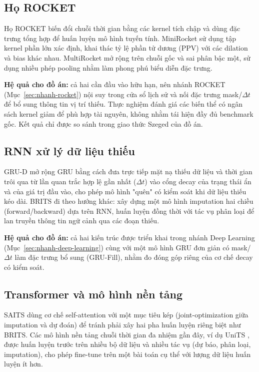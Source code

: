 \subsection{Họ ROCKET}
\label{sec:lit-rocket}

Họ ROCKET biến đổi chuỗi thời gian bằng các kernel tích chập và dùng đặc trưng tổng hợp để huấn luyện mô hình tuyến tính. MiniRocket \cite{dempster2021minirocket} sử dụng tập kernel phần lớn xác định, khai thác tỷ lệ phần tử dương (PPV) với các dilation và bias khác nhau. MultiRocket \cite{tan2022multirocket} mở rộng trên chuỗi gốc và sai phân bậc một, sử dụng nhiều phép pooling nhằm làm phong phú biểu diễn đặc trưng.

\textbf{Hệ quả cho đồ án:} cả hai cần đầu vào hữu hạn, nên nhánh ROCKET (Mục~\ref{sec:nhanh-rocket}) nội suy trong cửa sổ lịch sử và nối đặc trưng mask/$\Delta t$ để bổ sung thông tin vị trí thiếu. Thực nghiệm đánh giá các biến thể có ngân sách kernel giảm để phù hợp tài nguyên, không nhằm tái hiện đầy đủ benchmark gốc. Kết quả chỉ được so sánh trong giao thức Szeged của đồ án.

\subsection{RNN xử lý dữ liệu thiếu}
\label{sec:lit-rnn-missing}

GRU-D \cite{che2018grud} mở rộng GRU bằng cách đưa trực tiếp mặt nạ thiếu dữ liệu và thời
gian trôi qua từ lần quan trắc hợp lệ gần nhất ($\Delta t$) vào cổng decay của trạng thái
ẩn và của giá trị đầu vào, cho phép mô hình "quên" có kiểm soát khi dữ liệu thiếu kéo
dài. BRITS \cite{cao2018brits} đi theo hướng khác: xây dựng một mô hình imputation hai
chiều (forward/backward) dựa trên RNN, huấn luyện đồng thời với tác vụ phân loại để lan
truyền thông tin ngữ cảnh qua các đoạn thiếu.

\textbf{Hệ quả cho đồ án:} cả hai kiến trúc được triển khai trong nhánh Deep Learning
(Mục~\ref{sec:nhanh-deep-learning}) cùng với một mô hình GRU đơn giản có mask/$\Delta t$
làm đặc trưng bổ sung (GRU-Fill), nhằm đo đóng góp riêng của cơ chế decay có kiểm soát.

\subsection{Transformer và mô hình nền tảng}
\label{sec:lit-transformer}

SAITS \cite{du2023saits} dùng cơ chế self-attention với một mục tiêu kép (joint-optimization
giữa imputation và dự đoán) để tránh phải xây hai pha huấn luyện riêng biệt như BRITS.
Các mô hình nền tảng chuỗi thời gian đa nhiệm gần đây, ví dụ UniTS \cite{gao2024units},
được huấn luyện trước trên nhiều bộ dữ liệu và nhiều tác vụ (dự báo, phân loại,
imputation), cho phép fine-tune trên một bài toán cụ thể với lượng dữ liệu huấn luyện ít
hơn.


